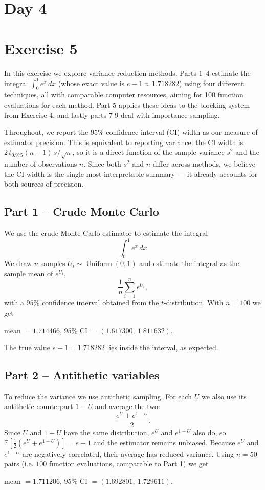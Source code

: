 \section*{Day 4}
\section*{Exercise 5}
In this exercise we explore variance reduction methods. Parts 1--4 estimate the integral $\int_0^1 e^x\,dx$ (whose exact value is $e-1 \approx 1.718282$) using four different techniques, all with comparable computer resources, aiming for 100 function evaluations for each method. Part 5 applies these ideas to the blocking system from Exercise 4, and lastly parts 7-9 deal with importance sampling.

Throughout, we report the $95\%$ confidence interval (CI) width as our measure of estimator precision. This is equivalent to reporting variance: the CI width is $2\,t_{0.975}(n-1)\,s/\sqrt{n}$, so it is a direct function of the sample variance $s^2$ and the number of observations $n$. Since both $s^2$ and $n$ differ across methods, we believe the CI width is the single most interpretable summary — it already accounts for both sources of precision.

\subsection*{Part 1 -- Crude Monte Carlo}
We use the crude Monte Carlo estimator to estimate the integral
\[
\int_0^1 e^x \, dx
\]
We draw $n$ samples $U_i \sim \operatorname{Uniform}(0,1)$ and estimate the integral as the sample mean of $e^{U_i}$,
\[
\frac{1}{n}\sum_{i=1}^n e^{U_i},
\]
with a $95\%$ confidence interval obtained from the $t$-distribution. With $n=100$ we get
\begin{center}
mean $= 1.714466$, \quad $95\%$ CI $= (1.617300,\ 1.811632)$.
\end{center}
The true value $e-1 = 1.718282$ lies inside the interval, as expected.

\subsection*{Part 2 -- Antithetic variables}
To reduce the variance we use antithetic sampling. For each $U$ we also use its antithetic counterpart $1-U$ and average the two:
\[
\frac{e^{U}+e^{1-U}}{2}.
\]
Since $U$ and $1-U$ have the same distribution, $e^{U}$ and $e^{1-U}$ also do, so $\mathbb{E}\!\left[\tfrac{1}{2}(e^{U}+e^{1-U})\right] = e-1$ and the estimator remains unbiased. Because $e^{U}$ and $e^{1-U}$ are negatively correlated, their average has reduced variance. Using $n=50$ pairs (i.e. $100$ function evaluations, comparable to Part 1) we get
\begin{center}
mean $= 1.711206$, \quad $95\%$ CI $= (1.692801,\ 1.729611)$.
\end{center}

